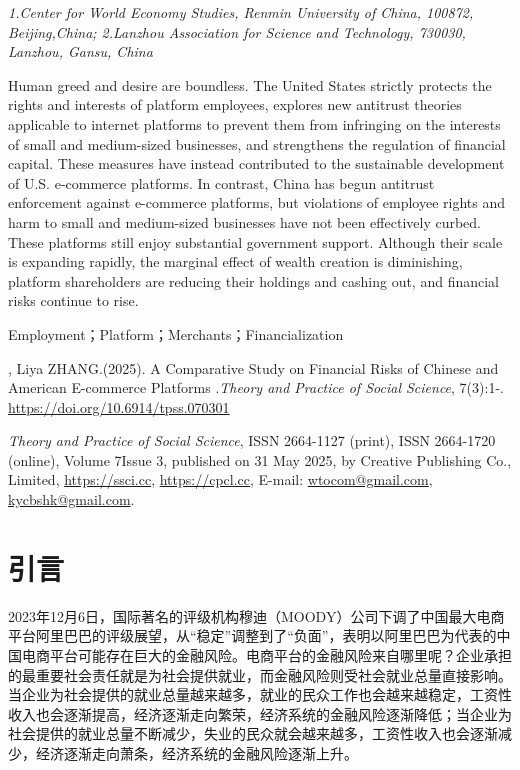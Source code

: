 \documentclass[12pt,twoside,utf8]{ctexart}
\newcommand{\vol}{7}
\newcommand{\iss}{3}
\newcommand{\pubyear}{2025}
\newcommand{\startpage}{1}
\newcommand{\doi}{10.6914/tpss.070301}
\newcommand{\articletitleen}{A Comparative Study on Financial Risks of Chinese and American E-commerce Platforms
}
\newcommand{\authoroneen}{Yougang ZHOU}
\newcommand{\authortwoen}{Liya ZHANG}
\begin{document}
\noindent \textit{1.Center for World Economy Studies, Renmin University of China, 100872, Beijing,China; 2.Lanzhou Association for Science and Technology, 730030, Lanzhou, Gansu, China
}

Human greed and desire are boundless. The United States strictly protects the rights and interests of platform employees, explores new antitrust theories applicable to internet platforms to prevent them from infringing on the interests of small and medium-sized businesses, and strengthens the regulation of financial capital. These measures have instead contributed to the sustainable development of U.S. e-commerce platforms. In contrast, China has begun antitrust enforcement against e-commerce platforms, but violations of employee rights and harm to small and medium-sized businesses have not been effectively curbed. These platforms still enjoy substantial government support. Although their scale is expanding rapidly, the marginal effect of wealth creation is diminishing, platform shareholders are reducing their holdings and cashing out, and financial risks continue to rise.


 Employment；Platform；Merchants；Financialization

\ifthenelse{\equal{\authortwoen}{}}{\authoroneen}{\authoroneen},   \authortwoen.(\pubyear). \articletitleen.\textit{Theory and Practice of Social Science}, \vol(\iss):\startpage-\pageref{LastPage}. \url{https://doi.org/\doi}

 \textit{Theory and Practice of Social Science}, ISSN 2664-1127 (print), ISSN 2664-1720 (online), Volume \vol \quad Issue \iss, published on 31 May \pubyear, by Creative Publishing Co., Limited, \url{https://ssci.cc}, \url{https://cpcl.cc}, E-mail: \url{wtocom@gmail.com}, \url{kycbshk@gmail.com}.


\hspace*{\fill}

{\centering\section *{引言}} 

2023年12月6日，国际著名的评级机构穆迪（MOODY）公司下调了中国最大电商平台阿里巴巴的评级展望，从“稳定”调整到了“负面”，表明以阿里巴巴为代表的中国电商平台可能存在巨大的金融风险。电商平台的金融风险来自哪里呢？企业承担的最重要社会责任就是为社会提供就业，而金融风险则受社会就业总量直接影响。当企业为社会提供的就业总量越来越多，就业的民众工作也会越来越稳定，工资性收入也会逐渐提高，经济逐渐走向繁荣，经济系统的金融风险逐渐降低；当企业为社会提供的就业总量不断减少，失业的民众就会越来越多，工资性收入也会逐渐减少，经济逐渐走向萧条，经济系统的金融风险逐渐上升。
\end{document}
